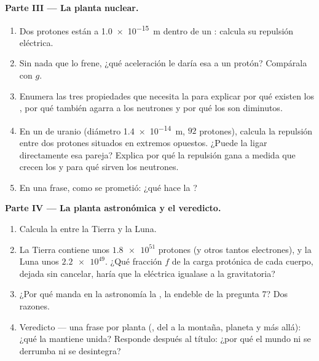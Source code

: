 \begin{problem}
\medskip
\noindent\textbf{Parte III --- La planta nuclear.}
\begin{enumerate}[resume]
  \item Dos protones están a \qty{1.0e-15}{m} dentro de un :
        calcula su repulsión eléctrica.
  \item Sin nada que lo frene, ¿qué aceleración le daría esa  a un
        protón? Compárala con $g$.
  \item Enumera las tres propiedades que necesita la 
        para explicar por qué existen los , por qué también
        agarra a los neutrones y por qué los  son diminutos.
  \item En un  de uranio (diámetro \qty{1.4e-14}{m}, $92$
        protones), calcula la repulsión entre dos protones situados en
        extremos opuestos. ¿Puede la  ligar
        directamente esa pareja? Explica por qué la repulsión gana a
        medida que crecen los  y para qué sirven los neutrones.
  \item En una frase, como se prometió: ¿qué hace la ?
\end{enumerate}

\medskip
\noindent\textbf{Parte IV --- La planta astronómica y el veredicto.}
\begin{enumerate}[resume]
  \item Calcula la  entre la Tierra y la Luna.
  \item La Tierra contiene unos $\num{1.8e51}$ protones (y otros tantos
        electrones), y la Luna unos $\num{2.2e49}$. ¿Qué fracción $f$ de
        la carga protónica de cada cuerpo, dejada sin cancelar, haría
        que la  eléctrica igualase a la gravitatoria?
  \item ¿Por qué manda en la astronomía la , la endeble de la
        pregunta 7? Dos razones.
  \item Veredicto --- una frase por planta (, del  a la
        montaña, planeta y más allá): ¿qué la mantiene unida? Responde
        después al título: ¿por qué el mundo ni se derrumba ni se
        desintegra?
\end{enumerate}
\end{problem}
